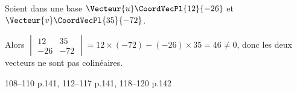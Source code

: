 \documentclass[a4paper]{article}
\begin{document}
\begin{example}{}{}

  Soient dans une base $\Vecteur{u}\CoordVecPl{12}{-26}$ et $\Vecteur{v}\CoordVecPl{35}{-72}$.

  Alors $\begin{vmatrix} 
    12 & 35 \\ 
    -26 & -72 
    \end{vmatrix} = 12\times(-72)-(-26)\times 35=46\neq 0$, donc les deux vecteurs ne sont pas colinéaires.
\end{example}

\begin{exercices}{}{}
  108--110 p.141, 112--117 p.141, 118--120 p.142
\end{exercices}


  
\end{document}
